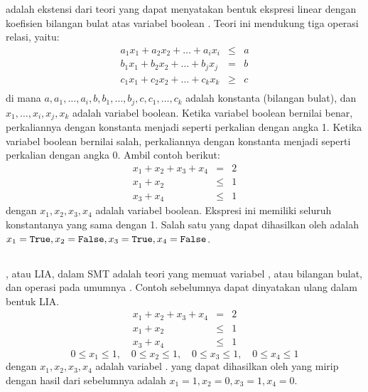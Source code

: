  adalah ekstensi dari teori  yang dapat menyatakan bentuk ekspresi linear dengan koefisien bilangan bulat atas variabel boolean \citep{yurichev}. Teori ini mendukung tiga operasi relasi, yaitu:
\[
\begin{array}{lcl}
	a_1 x_1 + a_2 x_2 + \ldots + a_i x_i &\leq& a \\
	b_1 x_1 + b_2 x_2 + \ldots + b_j x_j &=& b \\
	c_1 x_1 + c_2 x_2 + \ldots + c_k x_k &\geq& c \\
\end{array}
\]
di mana \(a, a_1, \ldots, a_i, b, b_1, \ldots, b_j, c, c_1, \ldots, c_k\) adalah konstanta  (bilangan bulat), dan \(x_1,\ldots,x_i,x_j,x_k\) adalah variabel boolean. Ketika variabel boolean bernilai benar, perkaliannya dengan konstanta menjadi seperti perkalian dengan angka 1. Ketika variabel boolean bernilai salah, perkaliannya dengan konstanta menjadi seperti perkalian dengan angka 0. Ambil contoh berikut:
\[
\begin{array}{rcl}
	x_1 + x_2 + x_3 + x_4 &=& 2 \\
	x_1 + x_2 &\leq& 1 \\
	x_3 + x_4 &\leq& 1
\end{array}
\]
dengan \(x_1, x_2, x_3, x_4\) adalah variabel boolean. Ekspresi ini memiliki seluruh konstantanya yang sama dengan 1. Salah satu  yang dapat dihasilkan oleh  adalah \(x_1 = \mathtt{True}, x_2 = \mathtt{False}, x_3 = \mathtt{True}, x_4 = \mathtt{False}\).

\subsection{}

, atau LIA, dalam SMT adalah teori yang memuat variabel , atau bilangan bulat, dan operasi  pada umumnya \citep{yurichev}. Contoh  sebelumnya dapat dinyatakan ulang dalam bentuk LIA.
\[
\begin{array}{rcl}
	x_1 + x_2 + x_3 + x_4 &=& 2 \\
	x_1 + x_2 &\leq& 1 \\
	x_3 + x_4 &\leq& 1
\end{array}
\]
\[ 0 \leq x_1 \leq 1, \quad 0 \leq x_2 \leq 1, \quad 0 \leq x_3 \leq 1, \quad 0 \leq x_4 \leq 1 \]
dengan \(x_1, x_2, x_3, x_4\) adalah variabel .  yang dapat dihasilkan oleh  yang mirip dengan hasil dari  sebelumnya adalah \(x_1 = 1, x_2 = 0, x_3 = 1, x_4 = 0\).

